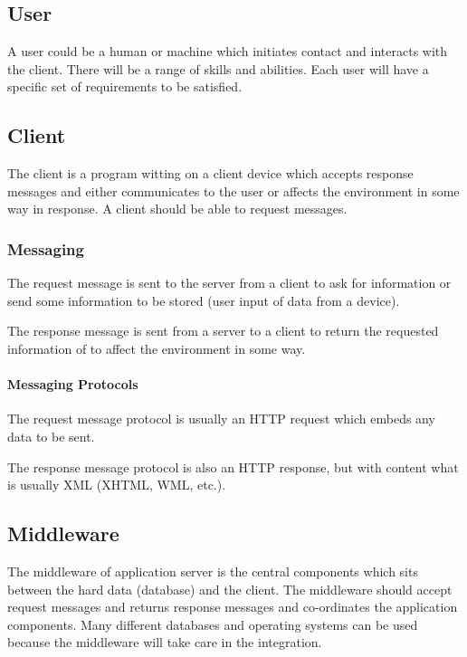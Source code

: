 \subsection{User}\label{sub:user}

A user could be a human or machine which initiates contact and interacts with the client.
There will be a range of skills and abilities.
Each user will have a specific set of requirements to be satisfied.

\subsection{Client}\label{sub:client}

The client is a program witting on a client device which accepts response messages and either communicates to the user or affects the environment in some way in response.
A client should be able to request messages.

\subsubsection{Messaging}\label{ssub:messaging}

The request message is sent to the server from a client to ask for information or send some information to be stored (user input of data from a device).

The response message is sent from a server to a client to return the requested information of to affect the environment in some way.

\paragraph{Messaging Protocols}\label{par:messaging_protocols}

The request message protocol is usually an HTTP request which embeds any data to be sent.

The response message protocol is also an HTTP response, but with content what is usually XML (XHTML, WML, etc.).

\subsection{Middleware}\label{sub:middleware}

The middleware of application server is the central components which sits between the hard data (database) and the client.
The middleware should accept request messages and returns response messages and co-ordinates the application components.
Many different databases and operating systems can be used because the middleware will take care in the integration.

